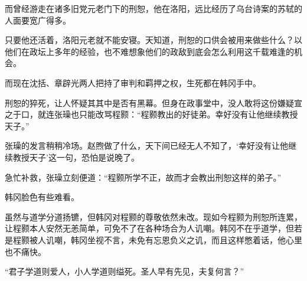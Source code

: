 而曾经游走在诸多旧党元老门下的刑恕，他在洛阳，远比经历了乌台诗案的苏轼的人面要宽广得多。

只要他还活着，洛阳元老就不能安寝。天知道，刑恕的口供会被用来做些什么？以他们在政坛上多年的经验，也不难想象他们的政敌到底会怎么利用这千载难逢的机会。

而现在沈括、章辟光两人把持了审判和羁押之权，生死都在韩冈手中。

刑恕的猝死，让人怀疑其其中是否有黑幕。但身在政事堂中，没人敢将这份嫌疑宣之于口，就连张璪也只能改骂程颢：“程颢教出的好徒弟。幸好没有让他继续教授天子。”

张璪的发言稍稍冷场。赵煦做了什么，天下间已经无人不知了，‘幸好没有让他继续教授天子’这一句，恐怕是说晚了。

急忙补救，张璪立刻便道：“程颢所学不正，故而才会教出刑恕这样的弟子。”

韩冈脸色有些难看。

虽然与道学分道扬镳，但韩冈对程颢的尊敬依然未改。现如今程颢为刑恕所连累，让程颢本人安然无恙简单，可免不了在各种场合为人讥嘲。韩冈不在乎道学，但若是程颢被人讥嘲，韩冈坐视不言，未免有忘恩负义之讥，而且这样憋着话，他心里也不痛快。

“君子学道则爱人，小人学道则缢死。圣人早有先见，夫复何言？”
